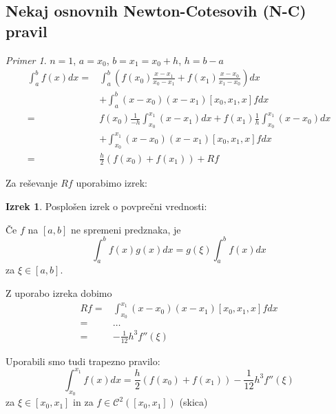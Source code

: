 \documentclass[a4paper,12pt]{article}
\theoremstyle{definition}
\newtheorem{theorem}[counter]{Izrek}
\theoremstyle{remark}
\newtheorem*{ex}{Primer}
\begin{document}
\subsection{Nekaj osnovnih Newton-Cotesovih (N-C) pravil}
\begin{ex}
    $n = 1$, $a = x_0$, $b = x_1 = x_0 + h$, $h = b-a$
    \begin{equation}
        \begin{split}
        \int_{a}^{b} f(x) dx =& \int_{a}^{b} (f(x_0) \frac{x-x_1}{x_0 - x_1} + f(x_1) \frac{x-x_0}{x_1-x_0}) dx \\
                                                              &+ \int_{a}^{b} (x-x_0)(x-x_1) [x_0, x_1, x] f dx \\
                             =& f(x_0) \frac{1}{-h} \int_{x_0}^{x_1} (x-x_1) dx + f(x_1) \frac{1}{h} \int_{x_0}^{x_1} (x-x_0) dx \\
                                                                        &+ \int_{x_0}^{x_1} (x-x_0) (x-x_1) [x_0, x_1, x] f dx \\
                             =& \frac{h}{2} (f(x_0) + f(x_1)) + Rf
        \end{split}
    \end{equation}
    
    Za reševanje $Rf$ uporabimo izrek:

    \begin{theorem}
        Posplošen izrek o povprečni vrednosti:
        
        Če $f$ na $[a, b]$ ne spremeni predznaka, je
        \begin{equation*}
            \int_{a}^{b} f(x) g(x) dx = g(\xi) \int_{a}^{b} f(x) dx
        \end{equation*}
        za $\xi \in [a, b]$.
    \end{theorem}

    Z uporabo izreka dobimo
    \begin{align*}
        Rf =& \int_{x_0}^{x_1} (x-x_0)(x-x_1) [x_0, x_1, x] f dx \\
           =& \dots \\
           =& - \frac{1}{12} h^3 f''(\xi)
    \end{align*}

    Uporabili smo tudi trapezno pravilo:
    \begin{equation*}
        \int_{x_0}^{x_1} f(x) dx = \frac{h}{2} (f(x_0) + f(x_1)) - \frac{1}{12} h^3 f''(\xi)
    \end{equation*}
    za $\xi \in [x_0, x_1]$ in za $f \in \mathscr{C}^2([x_0, x_1])$
    (skica)



\end{ex}
\end{document}
